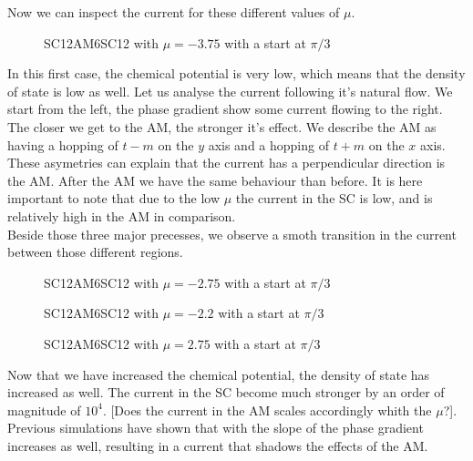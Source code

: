 \documentclass[../main.tex]{subfiles}
\begin{document}
Now we can inspect the current for these different values of $\mu$. 
\begin{figure}[H]
    \centering
    
    \caption{SC12AM6SC12 with $\mu=-3.75$ with a start at $\pi/3$}
\end{figure}
In this first case, the chemical potential is very low, which means that the density of state is low as well. Let us analyse the current following it's natural flow.
We start from the left, the phase gradient show some current flowing to the right. The closer we get to the AM, the stronger it's effect. We describe the AM as having
a hopping of $t-m$ on the $y$ axis and a hopping of $t+m$ on the $x$ axis. These asymetries can explain that the current has a perpendicular direction is the AM. 
After the AM we have the same behaviour than before. It is here important to note that due to the low $\mu$ the current in the SC is low, and is relatively high in the AM in comparison.\\
Beside those three major precesses, we observe a smoth transition in the current between those different regions. 
\begin{figure}[H]
    \centering
    
    \caption{SC12AM6SC12 with $\mu=-2.75$ with a start at $\pi/3$}
\end{figure}
\begin{figure}[H]
    \centering
    
    \caption{SC12AM6SC12 with $\mu=-2.2$ with a start at $\pi/3$}
\end{figure}
\begin{figure}[H]
    \centering
    
    \caption{SC12AM6SC12 with $\mu=2.75$ with a start at $\pi/3$}
\end{figure}
Now that we have increased the chemical potential, the density of state has increased as well. The current in the SC become much stronger by an order of magnitude of $10^4$. 
[Does the current in the AM scales accordingly whith the $\mu$?]. Previous simulations have shown that with the slope of the phase gradient increases as well, resulting 
in a current that shadows the effects of the AM.\\
\end{document}
